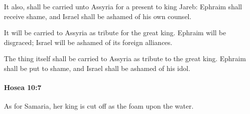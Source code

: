 			\begin{versebox}
					\item[BHS] 
					\item[LXX] 
					\item[ASV] It also, shall be carried unto Assyria for a present to king Jareb: Ephraim shall receive shame, and Israel shall be ashamed of his own counsel.
					\item[NIV] It will be carried to Assyria as tribute for the great king. Ephraim will be disgraced; Israel will be ashamed of its foreign alliances.
					\item[NRSV] The thing itself shall be carried to Assyria as tribute to the great king. Ephraim shall be put to shame, and Israel shall be ashamed of his idol.
			\end{versebox}

		\paragraph{Hosea 10:7} %
			\label{HOSEA-10-7}

			As for Samaria, her king is cut off as the foam upon the water.

